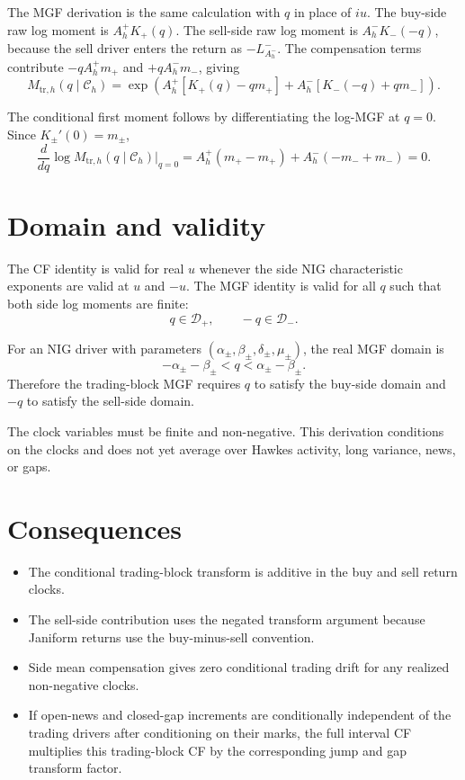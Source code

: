 \documentclass[11pt]{article}
\begin{document}
The MGF derivation is the same calculation with \(q\) in place of \(iu\). The
buy-side raw log moment is \(A_h^+K_+(q)\).
The sell-side raw log moment is \(A_h^-K_-(-q)\), because the sell driver enters
the return as \(-L_{A_h^-}^-\).
The compensation terms contribute \(-qA_h^+m_+\) and \(+qA_h^-m_-\), giving
\[
    M_{\mathrm{tr},h}(q\mid\mathcal C_h)
    =
    \exp\!\left(
        A_h^+\left[K_+(q)-qm_+\right]
        +
        A_h^-\left[K_-(-q)+qm_-\right]
    \right).
\]

The conditional first moment follows by differentiating the log-MGF at
\(q=0\). Since \(K_\pm'(0)=m_\pm\),
\[
    \frac{d}{dq}\log M_{\mathrm{tr},h}(q\mid\mathcal C_h)\bigg|_{q=0}
    =
    A_h^+(m_+-m_+)+A_h^-(-m_-+m_-)
    =
    0.
\]

\section{Domain and validity}

The CF identity is valid for real \(u\) whenever the side NIG characteristic
exponents are valid at \(u\) and \(-u\).
The MGF identity is valid for all \(q\) such that both side log moments are
finite:
\[
    q\in\mathcal D_+,
    \qquad
    -q\in\mathcal D_-.
\]

For an NIG driver with parameters \((\alpha_\pm,\beta_\pm,\delta_\pm,\mu_\pm)\),
the real MGF domain is
\[
    -\alpha_\pm-\beta_\pm
    <
    q
    <
    \alpha_\pm-\beta_\pm.
\]
Therefore the trading-block MGF requires \(q\) to satisfy the buy-side domain
and \(-q\) to satisfy the sell-side domain.

The clock variables must be finite and non-negative. This derivation conditions
on the clocks and does not yet average over Hawkes activity, long variance,
news, or gaps.

\section{Consequences}

\begin{itemize}
    \item The conditional trading-block transform is additive in the buy and sell return clocks.
    \item The sell-side contribution uses the negated transform argument because Janiform returns use the buy-minus-sell convention.
    \item Side mean compensation gives zero conditional trading drift for any realized non-negative clocks.
    \item If open-news and closed-gap increments are conditionally independent of the trading drivers after conditioning on their marks, the full interval CF multiplies this trading-block CF by the corresponding jump and gap transform factor.
\end{itemize}
\end{document}
